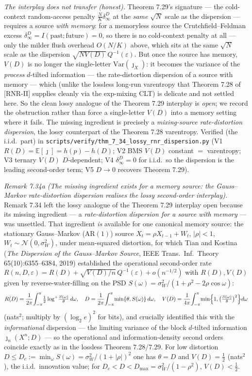 \documentclass[
]{article}
\begin{document}
\emph{The interplay does not transfer (honest).} Theorem 7.29's signature --- the
cold-context random-access penalty $\tfrac NK\delta_\infty^D$ at the \emph{same} $\sqrt N$
scale as the dispersion --- requires a source \emph{with memory}: for a memoryless source
the Crutchfield--Feldman excess $\delta_\infty^D=I(\text{past};\text{future})=0$, so there
is no cold-context penalty at all --- only the milder flush overhead $O(N/K)$ above, which
sits at the same $\sqrt N$ scale as the dispersion $\sqrt{N V(D)}\,Q^{-1}(\varepsilon)$.
But once the source has memory, $V(D)$ is no
longer the single-letter $\mathrm{Var}(\jmath_X)$: it becomes the variance of the
\emph{process} $d$-tilted information --- the rate-distortion dispersion of a source with
memory --- which (unlike the lossless long-run varentropy that Theorem 7.28 of [RNR-II] supplies
cleanly via the exp-mixing CLT) is delicate and not settled here. So the clean lossy
analogue of the Theorem 7.29 interplay is \emph{open}; we record the obstruction rather
than force a single-letter $V(D)$ into a memory setting where it fails. The missing
ingredient is precisely a \emph{mixing-source rate-distortion dispersion}, the lossy
counterpart of the Theorem 7.28 varentropy. Verified (the i.i.d.\ part) in
\texttt{scripts/verify/thm\_7\_34\_lossy\_rnr\_dispersion.py} (V1 $R(D)=\mathbb E[\jmath]
=h(p)-h(D)$; V2 BMS $V(D)$ constant $=$ varentropy; V3 ternary $V(D)$ $D$-dependent; V4
$\delta_\infty^D=0$ for i.i.d.\ so the dispersion is the leading second-order term; V5
$D\to0$ recovers Theorem 7.29).

\emph{Remark 7.34a (The missing ingredient exists for a memory source: the Gauss--Markov
rate-distortion dispersion realises the lossy second-order interplay).} Remark 7.34 left the
lossy analogue of the Theorem 7.29 interplay open because its missing ingredient --- a
\emph{rate-distortion dispersion for a source with memory} --- was unsettled. That ingredient
\emph{is} available for one canonical memory source: the stationary Gauss--Markov (AR$(1)$)
source $X_t=\rho X_{t-1}+W_t$, $|\rho|<1$, $W_t\sim\mathcal N(0,\sigma_W^2)$, under
mean-squared distortion, for which Tian and Kostina (\emph{The Dispersion of the Gauss--Markov
Source}, IEEE Trans.\ Inf.\ Theory 65(10):6355--6384, 2019) established the operational
second-order rate $R(n,D,\varepsilon)=R(D)+\sqrt{V(D)/n}\,Q^{-1}(\varepsilon)+o(n^{-1/2})$
with $R(D),V(D)$ given by reverse-water-filling on the PSD
$S(\omega)=\sigma_W^2/(1+\rho^2-2\rho\cos\omega)$:
\[
  R(D)=\frac1{2\pi}\!\int_{-\pi}^{\pi}\!\tfrac12\log^{+}\!\tfrac{S(\omega)}{\theta}\,d\omega,
  \quad D=\frac1{2\pi}\!\int_{-\pi}^{\pi}\!\min\{\theta,S(\omega)\}\,d\omega,
  \quad
  V(D)=\frac1{4\pi}\!\int_{-\pi}^{\pi}\!\min\Bigl\{1,\bigl(\tfrac{S(\omega)}{\theta}\bigr)^2\Bigr\}d\omega
\]
(nats$^2$; multiply by $(\log_2 e)^2$ for bits), and crucially identified this with the
\emph{informational} dispersion --- the limiting variance of the block $d$-tilted information
$\jmath_n(X^n;D)$ --- so the operational and information-density second orders coincide exactly
as in the lossless Theorem 7.28/7.29. For low distortion $D\le D_c:=\min_\omega S(\omega)=
\sigma_W^2/(1+|\rho|)^2$ one has $\theta=D$ and $V(D)=\tfrac12$ (nats$^2$), the i.i.d.\
innovation value; for $D_c<D<D_{\max}=\sigma_W^2/(1-\rho^2)$, $V(D)<\tfrac12$.
\end{document}
